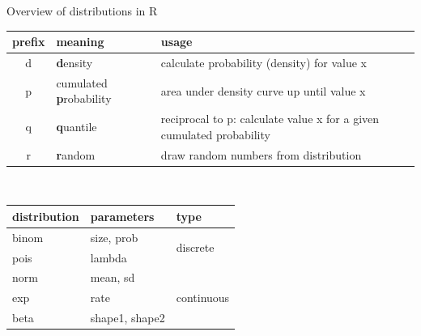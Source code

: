 \documentclass[xcolor=table,           xcolor=dvipsnames]{beamer}\usepackage[]{graphicx}\usepackage[]{color}
\begin{document}

\begin{frame}{Overview of distributions in R}
\begin{center}
\begin{tabular}{| c | m{2cm} | m{7cm} |}   \hline
  \textbf{prefix} & \textbf{meaning} &\textbf{usage}  \\ \hline  \hline
  d & \textbf{d}ensity               & calculate probability (density) for value x\\ \hline
  p & cumulated \newline \textbf{p}robability & area under density curve up until value x\\ \hline
  q & \textbf{q}uantile              & reciprocal to p: calculate value x \newline for a given cumulated probability\\ \hline
  r & \textbf{r}andom                & draw random numbers from distribution\\ \hline
\end{tabular}
\\[\baselineskip]
\begin{tabular}{| l | l | l |}   \hline
  \textbf{distribution} & \textbf{parameters} & \textbf{type}  \\ \hline  \hline
   binom & size, prob     &  \multirow{2}{*}{discrete}\\ \cline{1-2}
   pois  & lambda         &  \\ \hline
   norm  & mean, sd       &  \multirow{3}{*}{continuous}\\ \cline{1-2}
   exp   & rate           &   \\ \cline{1-2}
   beta  & shape1, shape2 &\\ \hline
\end{tabular}
\end{center}
\end{frame}

\end{document}
